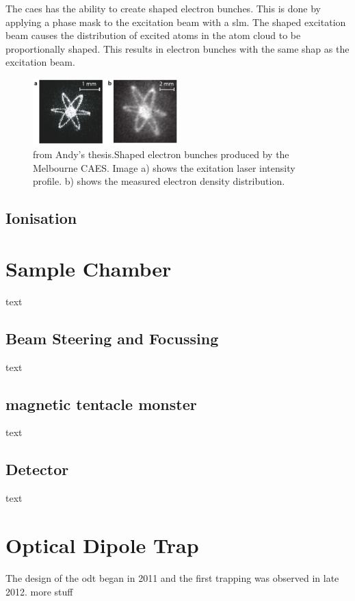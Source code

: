 The \gls{caes} has the ability to create shaped electron bunches. This is done by applying a phase mask to the excitation beam with a \gls{slm}. The shaped excitation beam causes the distribution of excited atoms in the atom cloud to be proportionally shaped. This results in electron bunches with the same shap as the excitation beam.

\begin{figure}[h]
\centering
\includegraphics[width=0.5\textwidth]{figs/atom_electrons.pdf}
\caption{{\color{red}from Andy's thesis.}Shaped electron bunches produced by the Melbourne CAES. Image a) shows the exitation laser intensity profile. b) shows the measured electron density distribution.}
\end{figure}

\subsection{Ionisation}



\section{Sample Chamber}
text
    \subsection{Beam Steering and Focussing}
text
    \subsection{magnetic tentacle monster}
text
    \subsection{Detector}
text
\section{Optical Dipole Trap}

The design of the \gls{odt} began in 2011 and the first trapping was observed in late 2012.
{\color{red} more stuff}


